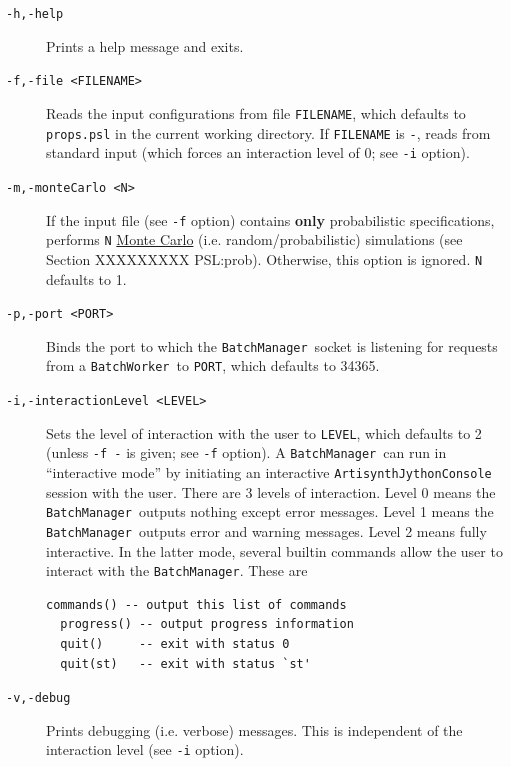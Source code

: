 \documentclass{article}
\newcommand{\BM}{{\tt BatchManager}}
\newcommand{\BW}{{\tt BatchWorker}}
\begin{document}
\begin{description}

\item[{\tt -h,-help} ] \mbox{}

Prints a help message and exits.

\item[{\tt -f,-file <FILENAME>} ] \mbox{}

Reads the input configurations from file {\tt FILENAME}, which defaults to {\tt props.psl} in the current working directory. If {\tt FILENAME} is {\tt -}, reads from standard input (which forces an interaction level of 0; see {\tt -i} option).

\item[{\tt -m,-monteCarlo <N>} ] \mbox{}

If the input file (see {\tt -f} option) contains \textbf{only} probabilistic specifications, performs {\tt N} \href{https://en.wikipedia.org/wiki/Monte_Carlo_method}{Monte Carlo} (i.e. random/probabilistic) simulations (see Section XXXXXXXXX PSL:prob). Otherwise, this option is ignored. {\tt N} defaults to 1.

\item[{\tt -p,-port <PORT>} ] \mbox{}

Binds the port to which the \BM\ socket is listening for requests from a \BW\ to {\tt PORT}, which defaults to 34365.

\item[{\tt -i,-interactionLevel <LEVEL>} ] \mbox{}

Sets the level of interaction with the user to {\tt LEVEL}, which defaults to 2 (unless {\tt -f -} is given; see {\tt -f} option). A \BM\ can run in ``interactive mode'' by initiating an interactive {\tt ArtisynthJythonConsole} session with the user. There are 3 levels of interaction. Level 0 means the \BM\ outputs nothing except error messages. Level 1 means the \BM\ outputs error and warning messages. Level 2 means fully interactive. In the latter mode, several builtin commands allow the user to interact with the \BM. These are

\begin{lstlisting}[]
  commands() -- output this list of commands
  progress() -- output progress information
  quit()     -- exit with status 0
  quit(st)   -- exit with status `st'
\end{lstlisting}

\item[{\tt -v,-debug} ] \mbox{}

Prints debugging (i.e. verbose) messages. This is independent of the interaction level (see {\tt -i} option).


\end{description}
\end{document}
